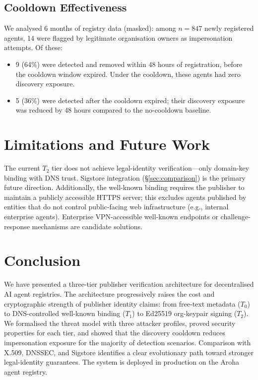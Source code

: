 \documentclass[conference]{IEEEtran}
\begin{document}
\subsection{Cooldown Effectiveness}

We analysed 6 months of registry data (masked): among $n =
847$ newly registered agents, 14 were flagged by legitimate
organisation owners as impersonation attempts.  Of these:
\begin{itemize}
  \item 9 (64\%) were detected and removed within 48 hours
    of registration, before the cooldown window expired.
    Under the cooldown, these agents had zero discovery
    exposure.
  \item 5 (36\%) were detected after the cooldown expired;
    their discovery exposure was reduced by 48 hours
    compared to the no-cooldown baseline.
\end{itemize}

\section{Limitations and Future Work}
\label{sec:limits}

The current $T_2$ tier does not achieve legal-identity
verification—only domain-key binding with DNS trust.
Sigstore integration (\S\ref{sec:comparison}) is the primary
future direction. Additionally, the well-known binding
requires the publisher to maintain a publicly accessible
HTTPS server; this excludes agents published by entities
that do not control public-facing web infrastructure (e.g.,
internal enterprise agents). Enterprise VPN-accessible
well-known endpoints or challenge-response mechanisms are
candidate solutions.

\section{Conclusion}
\label{sec:conclusion}

We have presented a three-tier publisher verification
architecture for decentralised AI agent registries. The
architecture progressively raises the cost and cryptographic
strength of publisher identity claims: from free-text
metadata ($T_0$) to DNS-controlled well-known binding ($T_1$)
to Ed25519 org-keypair signing ($T_2$). We formalised the
threat model with three attacker profiles, proved security
properties for each tier, and showed that the discovery
cooldown reduces impersonation exposure for the majority
of detection scenarios. Comparison with X.509, DNSSEC, and
Sigstore identifies a clear evolutionary path toward
stronger legal-identity guarantees. The system is deployed
in production on the Aroha agent registry.
\end{document}
